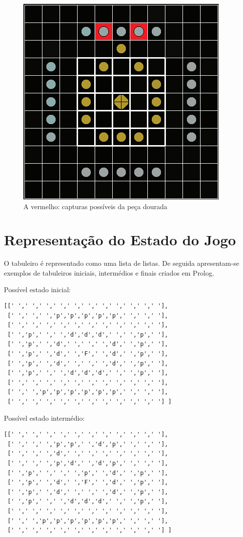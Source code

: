 \documentclass[a4paper]{article}
\begin{document}
\begin{figure}
\centering
\includegraphics[scale=1]{Breakthru_capture.png}
\caption{A vermelho: capturas possíveis da peça dourada}
\label{fig:moves}
\end{figure}



\section{Representação do Estado do Jogo}
O tabuleiro é representado como uma lista de listas. De seguida apresentam-se  exemplos de tabuleiros iniciais, intermédios e finais criados em Prolog.

Possível estado inicial:

\begin{verbatim} 
[[' ',' ',' ',' ',' ',' ',' ',' ',' ',' ',' '],
 [' ',' ',' ','p','p','p','p','p',' ',' ',' '],
 [' ',' ',' ',' ',' ',' ',' ',' ',' ',' ',' '],
 [' ','p',' ',' ','d','d','d',' ',' ','p',' '],
 [' ','p',' ','d',' ',' ',' ','d',' ','p',' '],
 [' ','p',' ','d',' ','F',' ','d',' ','p',' '],
 [' ','p',' ','d',' ',' ',' ','d',' ','p',' '],
 [' ','p',' ',' ','d','d','d',' ',' ','p',' '],
 [' ',' ',' ',' ',' ',' ',' ',' ',' ',' ',' '],
 [' ',' ','p','p','p','p','p','p',' ',' ',' '],
 [' ',' ',' ',' ',' ',' ',' ',' ',' ',' ',' '] ] 
\end{verbatim}

Possível estado intermédio:
\begin{verbatim}
[[' ',' ',' ',' ',' ',' ',' ',' ',' ',' ',' '],
 [' ',' ',' ','p','p',' ','d','p',' ',' ',' '],
 [' ',' ',' ','d',' ',' ',' ',' ',' ',' ',' '],
 [' ',' ',' ','p','d',' ','d','p',' ',' ',' '],
 [' ','p',' ',' ',' ','p',' ','d',' ','p',' '],
 [' ','p',' ','d',' ','F',' ','d',' ','p',' '],
 [' ','p',' ','d',' ',' ',' ','d',' ','p',' '],
 [' ','p',' ',' ','d','d','d',' ',' ','p',' '],
 [' ',' ',' ',' ',' ',' ',' ',' ',' ',' ',' '],
 [' ',' ','p','p','p','p','p','p',' ',' ',' '],
 [' ',' ',' ',' ',' ',' ',' ',' ',' ',' ',' '] ]
\end{verbatim}
\end{document}
